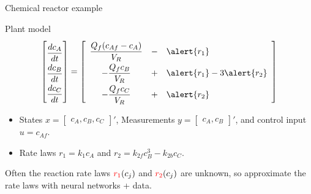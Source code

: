 \documentclass[xcolor=dvipsnames, 8pt]{beamer} %
\begin{document}
\begin{frame}{Chemical reactor example}
		
		\centerline{\resizebox{0.5\textwidth}{!}{}}
		\pause
		\begin{block}{Plant model}
			\begin{equation*}
				\renewcommand{\arraystretch}{2}
				\begin{bmatrix} 
					\dfrac{dc_A}{dt} \\
					\dfrac{dc_B}{dt} \\
					\dfrac{dc_C}{dt}
				\end{bmatrix} = \begin{bmatrix}
					\begin{array}{ccl}
						\dfrac{Q_f(c_{Af} - c_A)}{V_R} &-& \alert{r_1} 
						\\ 
						-\dfrac{Q_fc_B}{V_R} &+& \alert{r_1} - 3\alert{r_2} \\
						-\dfrac{Q_fc_C}{V_R} &+& \alert{r_2}
					\end{array}
				\end{bmatrix}
			\end{equation*}
	\begin{itemize}
		\item States $x = \begin{bmatrix} c_A, c_B, c_C\end{bmatrix}'$, 
		Measurements $y = \begin{bmatrix} c_A, c_B\end{bmatrix}'$, and control 
		input $u = c_{Af}$. 
		\item Rate laws $r_1 = k_1c_A$ and $r_2 = k_{2f}c^3_B - k_{2b}c_C$.
	\end{itemize}
	\end{block}
			Often the reaction rate laws
${\color{red}r_1}(c_j)$ and ${\color{red} r_2}(c_j)$ are unknown,
so approximate the rate laws with neural networks + data.
\end{frame}
\end{document}
